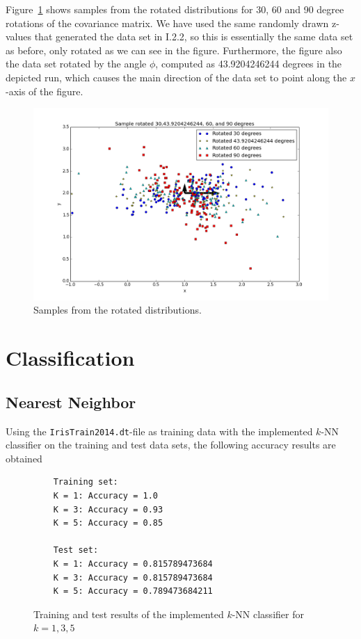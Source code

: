 \documentclass[a4paper]{article}
\begin{document}
Figure~\ref{fig:samples_rotated} shows samples from the rotated distributions for 30, 60 and 90 degree rotations of the covariance matrix. We have used the same randomly drawn z-values that generated the data set in I.2.2, so this is essentially the same data set as before, only rotated as we can see in the figure. Furthermore, the figure also the data set rotated by the angle $\phi$, computed as 43.9204246244 degrees in the depicted run, which causes the main direction of the data set to point along the $x$-axis of the figure. 


\begin{figure}[H]
  \centering
  \includegraphics[width=1\linewidth]{figures/samples_rotated.png}
  \caption{Samples from the rotated distributions.}
  \label{fig:samples_rotated}
\end{figure}

\section{Classification}

\subsection{Nearest Neighbor}
Using the \texttt{IrisTrain2014.dt}-file as training data with the implemented $k$-NN classifier on the training and test data sets, the following accuracy results are obtained
\begin{figure}[H]
	\begin{lstlisting}
	Training set:
	K = 1: Accuracy = 1.0
	K = 3: Accuracy = 0.93
	K = 5: Accuracy = 0.85

	Test set:
	K = 1: Accuracy = 0.815789473684
	K = 3: Accuracy = 0.815789473684
	K = 5: Accuracy = 0.789473684211
	\end{lstlisting}
	\caption{Training and test results of the implemented $k$-NN classifier for $k=1,3,5$}
	\label{fig:k-nn_results}
\end{figure}
\end{document}
